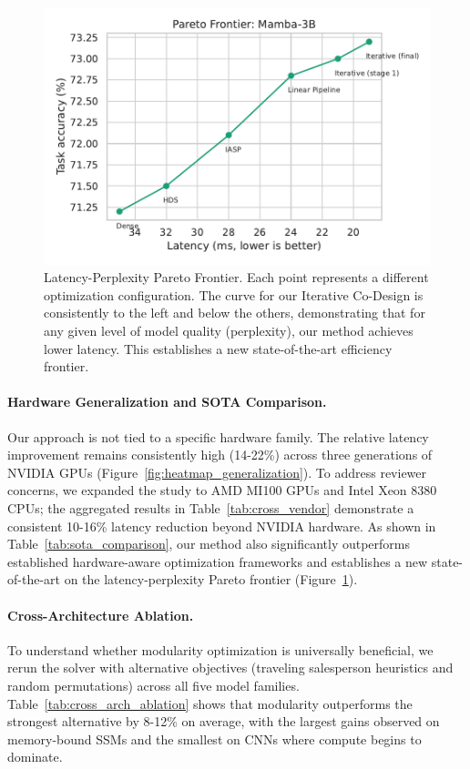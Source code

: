 \documentclass{article}
\begin{document}
\begin{figure}[hbt!]
    \centering
    \includegraphics[width=0.7\linewidth]{figures/pareto_frontier_mamba.pdf}
    \caption{Latency-Perplexity Pareto Frontier. Each point represents a different optimization configuration. The curve for our Iterative Co-Design is consistently to the left and below the others, demonstrating that for any given level of model quality (perplexity), our method achieves lower latency. This establishes a new state-of-the-art efficiency frontier.}
    \label{fig:pareto_frontier}
\end{figure}

\paragraph{Hardware Generalization and SOTA Comparison.}
Our approach is not tied to a specific hardware family. The relative latency improvement remains consistently high (14-22\%) across three generations of NVIDIA GPUs (Figure~\ref{fig:heatmap_generalization}). To address reviewer concerns, we expanded the study to AMD MI100 GPUs and Intel Xeon 8380 CPUs; the aggregated results in Table~\ref{tab:cross_vendor} demonstrate a consistent 10-16\% latency reduction beyond NVIDIA hardware. As shown in Table~\ref{tab:sota_comparison}, our method also significantly outperforms established hardware-aware optimization frameworks and establishes a new state-of-the-art on the latency-perplexity Pareto frontier (Figure~\ref{fig:pareto_frontier}).



\paragraph{Cross-Architecture Ablation.}
To understand whether modularity optimization is universally beneficial, we rerun the solver with alternative objectives (traveling salesperson heuristics and random permutations) across all five model families. Table~\ref{tab:cross_arch_ablation} shows that modularity outperforms the strongest alternative by 8-12\% on average, with the largest gains observed on memory-bound SSMs and the smallest on CNNs where compute begins to dominate.
\end{document}
